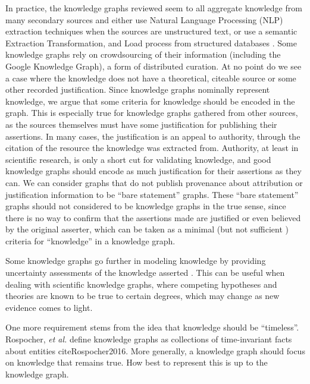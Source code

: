 In practice, the knowledge graphs reviewed seem to all aggregate knowledge from many secondary sources and either use Natural Language Processing (NLP) extraction techniques when the sources are unstructured text, or use a semantic Extraction Transformation, and Load process from structured databases \cite{McCusker_2009}.
Some knowledge graphs rely on crowdsourcing of their information (including the Google Knowledge Graph), a form of distributed curation.
At no point do we see a case where the knowledge does not have a theoretical, citeable source or some other recorded justification.
Since knowledge graphs nominally represent knowledge, we argue that some criteria for knowledge should be encoded in the graph.
This is especially true for knowledge graphs gathered from other sources, as the sources themselves must have some justification for publishing their assertions.
In many cases, the justification is an appeal to authority, through the citation of the resource the knowledge was extracted from.
Authority, at least in scientific research, is only a short cut for validating knowledge, and good knowledge graphs should encode as much justification for their assertions as they can.
We can consider graphs that do not publish provenance about attribution or justification information to be ``bare statement'' graphs.
These ``bare statement'' graphs should not considered to be knowledge graphs in the true sense, since there is no way to confirm that the assertions made are justified or even believed by the original asserter, which can be taken as a minimal (but not sufficient \cite{Gettier_1963}) criteria for ``knowledge'' in a knowledge graph.

Some knowledge graphs go further in modeling knowledge by providing uncertainty assessments of the knowledge asserted \cite{Dong_2014}.
This can be useful when dealing with scientific knowledge graphs, where competing hypotheses and theories are known to be true to certain degrees, which may change as new evidence comes to light.

One more requirement stems from the idea that knowledge should be ``timeless''.
Rospocher, \textit{et al.} define knowledge graphs as collections of time-invariant facts about entities cite{Rospocher2016}.
More generally, a knowledge graph should focus on knowledge that remains true.
How best to represent this is up to the knowledge graph.